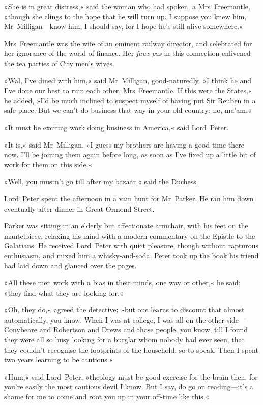 »She is in great distress,« said the woman who had spoken, a Mrs~Freemantle, »though she clings to the hope that he will turn up. I suppose you knew him, Mr~Milligan—know him, I should say, for I hope he's still alive somewhere.«

Mrs~Freemantle was the wife of an eminent railway director, and celebrated for her ignorance of the world of finance. Her \textit{faux pas} in this connection enlivened the tea parties of City men's wives.

»Wal, I've dined with him,« said Mr~Milligan, good-naturedly. »I think he and I've done our best to ruin each other, Mrs~Freemantle. If this were the States,« he added, »I'd be much inclined to suspect myself of having put Sir Reuben in a safe place. But we can't do business that way in your old country; no, ma'am.«

»It must be exciting work doing business in America,« said Lord~Peter.

»It is,« said Mr~Milligan. »I guess my brothers are having a good time there now. I'll be joining them again before long, as soon as I've fixed up a little bit of work for them on this side.«

»Well, you mustn't go till after my bazaar,« said the Duchess.

Lord~Peter spent the afternoon in a vain hunt for Mr~Parker. He ran him down eventually after dinner in Great Ormond Street.

Parker was sitting in an elderly but affectionate armchair, with his feet on the mantelpiece, relaxing his mind with a modern commentary on the Epistle to the Galatians. He received Lord~Peter with quiet pleasure, though without rapturous enthusiasm, and mixed him a whisky-and-soda. Peter took up the book his friend had laid down and glanced over the pages.

»All these men work with a bias in their minds, one way or other,« he said; »they find what they are looking for.«

»Oh, they do,« agreed the detective; »but one learns to discount that almost automatically, you know. When I was at college, I was all on the other side—Conybeare and Robertson and Drews and those people, you know, till I found they were all so busy looking for a burglar whom nobody had ever seen, that they couldn't recognise the footprints of the household, so to speak. Then I spent two years learning to be cautious.«

»Hum,« said Lord~Peter, »theology must be good exercise for the brain then, for you're easily the most cautious devil I know. But I say, do go on reading—it's a shame for me to come and root you up in your off-time like this.«

